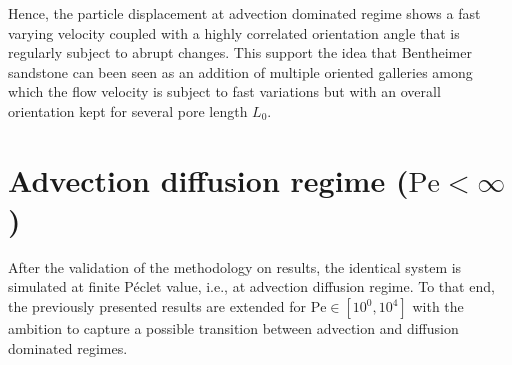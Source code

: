 Hence, the particle displacement at advection dominated regime shows a fast varying velocity coupled with a highly correlated orientation angle that is regularly subject to abrupt changes.
This support the idea that Bentheimer sandstone can been seen as an addition of multiple oriented galleries among which the flow velocity is subject to fast variations but with an overall orientation kept for several pore length $L_0$.

\chapter{Advection diffusion regime ($\mathrm{Pe}<\infty$)}
After the validation of the methodology on \citet{Meyer2016} results, the identical system is simulated at finite Péclet value, i.e., at advection diffusion regime. 
To that end, the previously presented results are extended for $\mathrm{Pe}\in[10^{0
},10^{4}]$ with the ambition to capture a possible transition between advection and diffusion dominated regimes.
